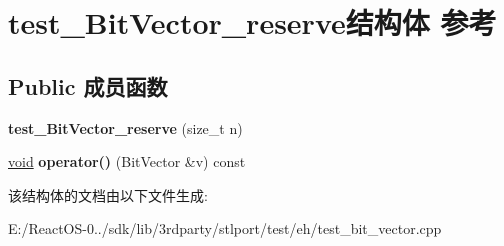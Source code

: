\hypertarget{structtest___bit_vector__reserve}{}\section{test\+\_\+\+Bit\+Vector\+\_\+reserve结构体 参考}
\label{structtest___bit_vector__reserve}
\subsection*{Public 成员函数}
\begin{DoxyCompactItemize}
\item 
\mbox{\label{structtest___bit_vector__reserve_afb425daf155cf00c5c30fe6ff9439ff1}} 
{\bfseries test\+\_\+\+Bit\+Vector\+\_\+reserve} (size\+\_\+t n)
\item 
\mbox{\label{structtest___bit_vector__reserve_acb264df64b546b610e2c51f2f2624bc9}} 
\hyperlink{interfacevoid}{void} {\bfseries operator()} (Bit\+Vector \&v) const
\end{DoxyCompactItemize}


该结构体的文档由以下文件生成\+:\begin{DoxyCompactItemize}
\item 
E\+:/\+React\+O\+S-\/0../sdk/lib/3rdparty/stlport/test/eh/test\+\_\+bit\+\_\+vector.\+cpp\end{DoxyCompactItemize}
